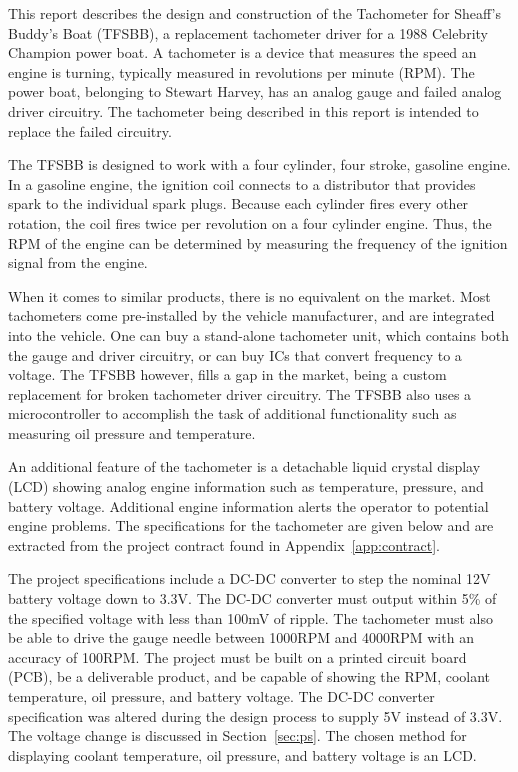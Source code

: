 This report describes the design and construction of the Tachometer for Sheaff's Buddy's Boat (TFSBB), a replacement tachometer driver for a 1988 Celebrity Champion power boat. A tachometer is a device that measures the speed an engine is turning, typically measured in revolutions per minute (RPM).  The power boat, belonging to Stewart Harvey, has an analog gauge and failed analog driver circuitry. The tachometer being described in this report is intended to replace the failed circuitry.

The TFSBB is designed to work with a four cylinder, four stroke, gasoline engine. In a gasoline engine, the ignition coil connects to a distributor that provides spark to the individual spark plugs. Because each cylinder fires every other rotation, the coil fires twice per revolution on a four cylinder engine. Thus, the RPM of the engine can be determined by measuring the frequency of the ignition signal from the engine. %


When it comes to similar products, there is no equivalent on the market. Most tachometers come pre-installed by the vehicle manufacturer, and are integrated into the vehicle. One can buy a stand-alone tachometer unit, which contains both the gauge and driver circuitry, or can buy ICs that convert frequency to a voltage. The TFSBB however, fills a gap in the market, being a custom replacement for broken tachometer driver circuitry. The TFSBB also uses a microcontroller to accomplish the task of additional functionality such as measuring oil pressure and temperature.

An additional feature of the tachometer is a detachable liquid crystal display (LCD) showing analog engine information such as temperature, pressure, and battery voltage. Additional engine information alerts the operator to potential engine problems. The specifications for the tachometer are given below and are extracted from the project contract found in Appendix~\ref{app:contract}.

The project specifications include a DC-DC converter to step the nominal 12V battery voltage down to 3.3V. The DC-DC converter must output within 5\% of the specified voltage with less than 100mV of ripple. The tachometer must also be able to drive the gauge needle between 1000RPM and 4000RPM with an accuracy of 100RPM. The project must be built on a printed circuit board (PCB), be a deliverable product, and be capable of showing the RPM, coolant temperature, oil pressure, and battery voltage. The DC-DC converter specification was altered during the design process to supply 5V instead of 3.3V. The voltage change is discussed in Section~\ref{sec:ps}. The chosen method for displaying coolant temperature, oil pressure, and battery voltage is an LCD.

